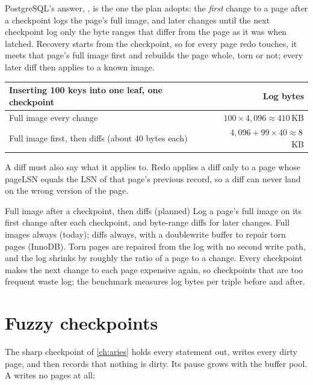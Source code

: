 PostgreSQL's answer, , is the one the plan adopts: the
\emph{first} change to a page after a checkpoint logs the page's full image,
and later changes until the next checkpoint log only the byte ranges that
differ from the page as it was when latched. Recovery starts from the
checkpoint, so for every page redo touches, it meets that page's full image
first and rebuilds the page whole, torn or not; every later diff then applies
to a known image.

\begin{center}
\begin{tabular}{@{}lr@{}}
\toprule
Inserting 100 keys into one leaf, one checkpoint & Log bytes \\
\midrule
Full image every change & $100 \times 4{,}096 \approx 410$\,KB \\
Full image first, then diffs (about 40 bytes each) & $4{,}096 + 99 \times 40 \approx 8$\,KB \\
\bottomrule
\end{tabular}
\end{center}

A diff must also say what it applies to. Redo applies a diff only to a page
whose pageLSN equals the LSN of that page's previous record, so a diff can
never land on the wrong version of the page.

\begin{decision}{Full image after a checkpoint, then diffs (planned)}
 Log a page's full image on its first change after each
checkpoint, and byte-range diffs for later changes.
 Full images always (today); diffs always, with a
doublewrite buffer to repair torn pages (InnoDB).
 Torn pages are repaired from the log with no second write path,
and the log shrinks by roughly the ratio of a page to a change.
 Every checkpoint makes the next change to each page expensive
again, so checkpoints that are too frequent waste log; the benchmark measures
log bytes per triple before and after.
\end{decision}

\section{Fuzzy checkpoints}

The sharp checkpoint of \cref{ch:aries} holds every statement out, writes
every dirty page, and then records that nothing is dirty. Its pause grows with
the buffer pool. A  writes no pages at all:


